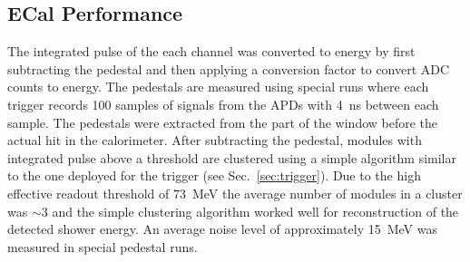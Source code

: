 \documentclass[final,3p,times,twocolumn]{elsarticle}
\newcommand{\Aprime}{A\ensuremath{^\prime}}
\begin{document}






\subsection{ECal Performance}
\label{sec:ecal_calibration}


The integrated pulse of the each channel was converted to energy by first 
subtracting the pedestal and then applying a conversion factor to convert ADC counts to energy. 
The pedestals are measured using special runs where each trigger records 100 samples of signals from 
the APDs with 4~ns between each sample. The pedestals were extracted from the 
part of the window before the actual hit in the calorimeter. After subtracting the pedestal, modules with 
integrated pulse above a threshold are clustered using a simple algorithm similar to the one deployed 
for the trigger (see Sec.~\ref{sec:trigger}). Due to the high effective readout threshold of $73$~MeV the 
average number of modules in a cluster was $\sim 3$ and the simple clustering algorithm worked well 
for reconstruction of the detected shower energy. An average noise level of approximately 15~MeV 
was measured in special pedestal runs. 
\end{document}
